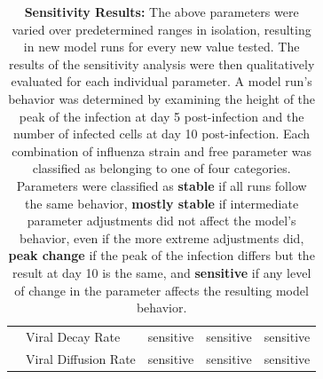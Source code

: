 \documentclass[10pt]{article}
\begin{document}
\begin{table}
\begin{center}
\begin{tabular}{| c | l | c c c |}
  & Viral Decay Rate & \cellcolor{red!40}sensitive & \cellcolor{red!40}sensitive & \cellcolor{red!40}sensitive \\
  & Viral Diffusion Rate & \cellcolor{red!40}sensitive & \cellcolor{red!40}sensitive & \cellcolor{red!40}sensitive \\
  \hline  
\end{tabular}
\caption{\textbf{Sensitivity Results:} The above parameters were varied over predetermined ranges in isolation, resulting in new model runs for every new value tested.  The results of the sensitivity analysis were then qualitatively evaluated for each individual parameter.  A model run's behavior was determined by examining the height of the peak of the infection at day 5 post-infection and the number of infected cells at day 10 post-infection.  Each combination of influenza strain and free parameter was classified as belonging to one of four categories.  Parameters were classified as \textbf{stable} if all runs follow the same behavior, \textbf{mostly stable} if intermediate parameter adjustments did not affect the model's behavior, even if the more extreme adjustments did, \textbf{peak change} if the peak of the infection differs but the result at day 10 is the same, and \textbf{sensitive} if any level of change in the parameter affects the resulting model behavior.}
\label{tab:sensitivity}
\end{center}
\end{table}
\end{document}
